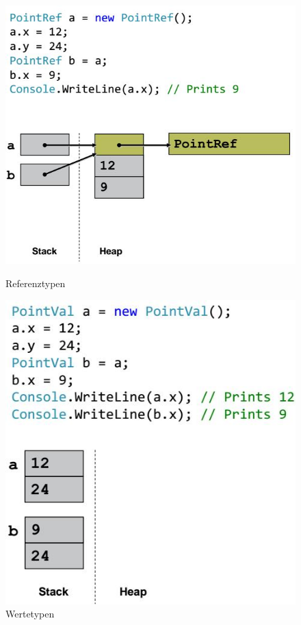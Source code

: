 \documentclass[
a4paper,
oneside,
10pt,
fleqn,
headsepline,
toc=listofnumbered, 
bibliography=totocnumbered]{scrartcl}
\begin{document}
\begin{figure}[ht!]
	\centering
	\begin{minipage}[t]{0.4\textwidth}
		\centering
		\includegraphics[width=0.8\linewidth]{images/reference_types}
		\caption{Referenztypen}
		\label{fig:searchtreeinsert1}
	\end{minipage}
	\begin{minipage}[t]{0.4\textwidth}
		\centering
		\includegraphics[width=0.8\linewidth]{images/value_types}
		\caption{Wertetypen}
		\label{fig:searchtreeinsert2}
	\end{minipage}
\end{figure}
\end{document}
